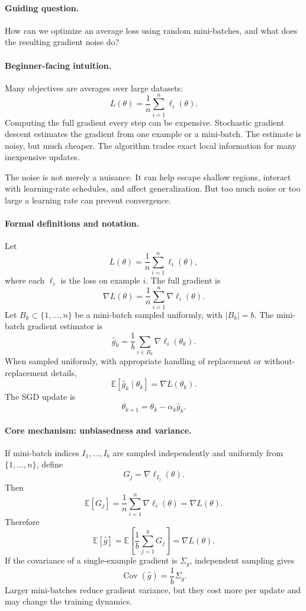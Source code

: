 \paragraph{Guiding question.}
How can we optimize an average loss using random mini-batches, and what does the resulting gradient noise do?

\paragraph{Beginner-facing intuition.}
Many objectives are averages over large datasets:
\[
L(\theta)=\frac1n\sum_{i=1}^n \ell_i(\theta).
\]
Computing the full gradient every step can be expensive. Stochastic gradient descent estimates the gradient from one example or a mini-batch. The estimate is noisy, but much cheaper. The algorithm trades exact local information for many inexpensive updates.

The noise is not merely a nuisance. It can help escape shallow regions, interact with learning-rate schedules, and affect generalization. But too much noise or too large a learning rate can prevent convergence.

\paragraph{Formal definitions and notation.}
Let
\[
L(\theta)=\frac1n\sum_{i=1}^n \ell_i(\theta),
\]
where each \(\ell_i\) is the loss on example \(i\). The full gradient is
\[
\nabla L(\theta)=\frac1n\sum_{i=1}^n \nabla \ell_i(\theta).
\]
Let \(B_k\subset\{1,\ldots,n\}\) be a mini-batch sampled uniformly, with \(|B_k|=b\). The mini-batch gradient estimator is
\[
\widehat g_k
=\frac1b\sum_{i\in B_k}\nabla \ell_i(\theta_k).
\]
When sampled uniformly, with appropriate handling of replacement or without-replacement details,
\[
\boxed{
\mathbb E[\widehat g_k\mid \theta_k]=\nabla L(\theta_k).
}
\]
The SGD update is
\[
\boxed{
\theta_{k+1}=\theta_k-\alpha_k\widehat g_k.
}
\]

\paragraph{Core mechanism: unbiasedness and variance.}
If mini-batch indices \(I_1,\ldots,I_b\) are sampled independently and uniformly from \(\{1,\ldots,n\}\), define
\[
G_j=\nabla \ell_{I_j}(\theta).
\]
Then
\[
\mathbb E[G_j]=\frac1n\sum_{i=1}^n\nabla \ell_i(\theta)=\nabla L(\theta).
\]
Therefore
\[
\mathbb E[\widehat g]=
\mathbb E\left[\frac1b\sum_{j=1}^bG_j\right]
=\nabla L(\theta).
\]
If the covariance of a single-example gradient is \(\Sigma_g\), independent sampling gives
\[
\operatorname{Cov}(\widehat g)=\frac{1}{b}\Sigma_g.
\]
Larger mini-batches reduce gradient variance, but they cost more per update and may change the training dynamics.

